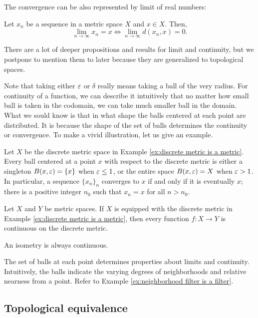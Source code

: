 The convergence can be also represented by limit of real numbers:
\begin{prop}
Let $x_n$ be a sequence in a metric space $X$ and $x\in X$.
Then,
\[\lim_{n\to\infty}x_n=x\iff\lim_{n\to\infty}d(x_n,x)=0.\]
\end{prop}


There are a lot of deeper propositions and results for limit and continuity, but we postpone to mention them to later because they are generalized to topological spaces.

Note that taking either $\varepsilon$ or $\delta$ really means taking a ball of the very radius.
For continuity of a function, we can describe it intuitively that no matter how small ball is taken in the codomain, we can take much smaller ball in the domain.
What we sould know is that in what shape the balls centered at each point are distributed.
It is because the shape of the set of balls determines the continuity or convergence.
To make a vivid illustration, let us give an example.

\begin{ex}
Let $X$ be the discrete metric space in Example \ref{ex:discrete metric is a metric}.
Every ball centered at a point $x$ with respect to the discrete metric is either a singleton $B(x,\varepsilon)=\{x\}$ when $\varepsilon\le1$, or the entire space $B(x,\varepsilon)=X$ when $\varepsilon>1$.
In particular, a sequence $\{x_n\}_n$ converges to $x$ if and only if it is eventually $x$; there is a positive integer $n_0$ such that $x_n=x$ for all $n>n_0$.
\end{ex}
\begin{ex}
Let $X$ and $Y$ be metric spaces.
If $X$ is equipped with the discrete metric in Example \ref{ex:discrete metric is a metric}, then every function $f:X\to Y$ is continuous on the discrete metric.
\end{ex}
\begin{ex}
An isometry is always continuous.
\end{ex}

The set of balls at each point determines properties about limits and continuity.
Intuitively, the balls indicate the varying degrees of neighborhoods and relative nearness from a point.
Refer to Example \ref{ex:neighborhood filter is a filter}.



\subsection{Topological equivalence}

